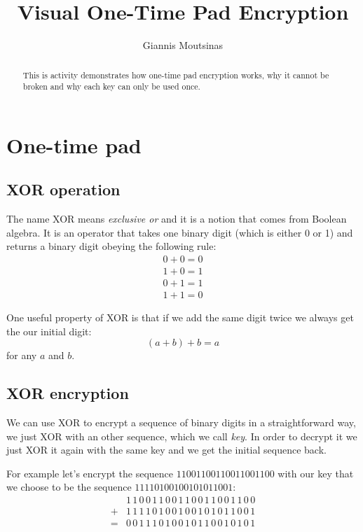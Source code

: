 \documentclass[a4paper,10pt]{article}
\title{Visual One-Time Pad Encryption}
\author{Giannis Moutsinas}
\begin{document}
\maketitle

\thispagestyle{empty}

\begin{abstract}
 This is activity demonstrates how one-time pad encryption works, why it cannot be broken and why each key can only be used once.
\end{abstract}

\vfill

\doclicenseThis

\newpage

\section{One-time pad}

\subsection{XOR operation}

The name XOR means \textit{exclusive or} and it is a notion that comes from Boolean algebra. It is an operator that takes one binary digit (which is either 0 or 1) and returns a binary digit obeying the following rule:
\begin{align*}
0+0=0\\
1+0=1\\
0+1=1\\
1+1=0
\end{align*}

One useful property of XOR is that if we add the same digit twice we always get the our initial digit:
\begin{equation*}
(a+b)+b=a
\end{equation*}
for any $a$ and $b$.

\subsection{XOR encryption}

We can use XOR to encrypt a sequence of binary digits in a straightforward way, we just XOR with an other sequence, which we call \textit{key}. In order to decrypt it we just XOR it again with the same key and we get the initial sequence back.

For example let's encrypt the sequence $11001100110011001100$ with our key that we choose to be the sequence $11110100100101011001$:
\begin{equation*}
\begin{array}{rl}
  & 1\,1\,0\,0\,1\,1\,0\,0\,1\,1\,0\,0\,1\,1\,0\,0\,1\,1\,0\,0\\
+ & 1\,1\,1\,1\,0\,1\,0\,0\,1\,0\,0\,1\,0\,1\,0\,1\,1\,0\,0\,1\\ \hline
= & 0\,0\,1\,1\,1\,0\,1\,0\,0\,1\,0\,1\,1\,0\,0\,1\,0\,1\,0\,1
\end{array}
\end{equation*}
\end{document}
